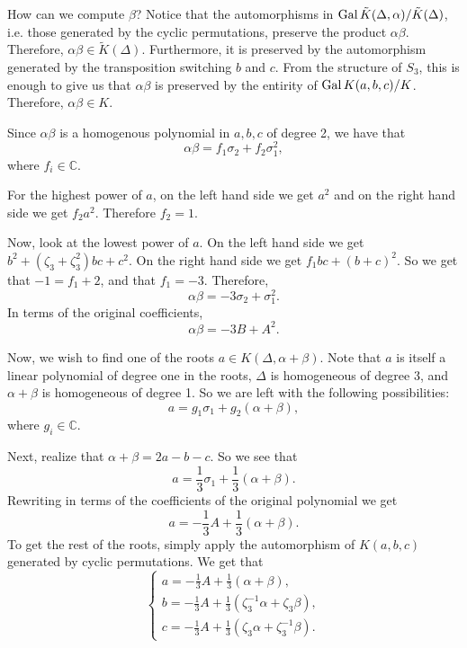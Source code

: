 How can we compute \(\beta\)? Notice that the
automorphisms in \(\operatorname{Gal} \tilde K(\Delta, \alpha) / \tilde K(\Delta)\), i.e. those generated by the
cyclic permutations, preserve the product \(\alpha\beta\). Therefore, \(\alpha\beta \in \tilde K(\Delta)\). 
Furthermore, it is preserved by the automorphism generated by the transposition switching \(b\) and \(c\).
From the structure of \(S_3\), this is enough to give us that \(\alpha\beta\) is preserved by the entirity
of \(\operatorname{Gal} K(a,b,c) / K\). Therefore, \(\alpha\beta \in K\).

Since \(\alpha\beta\) is a homogenous polynomial in \(a, b, c\) of degree 2, we have that
\begin{equation}
\alpha\beta = f_1 \sigma_2 + f_2 \sigma_1^2, 
\end{equation}
where \(f_i \in \mathbb C\).

For the highest power of \(a\), on the left hand side we get \(a^2\) and on the right hand side we
get \(f_2 a^2\). Therefore \(f_2 = 1\).

Now, look at the lowest power of \(a\). On the left hand side we get \(b^2 + (\zeta_3 + \zeta_3^2)bc + c^2\).
On the right hand side we get \(f_1 bc + (b + c)^2\). So we get that \(-1 = f_1 + 2\), and that \(f_1 = -3\).
Therefore,
\begin{equation}
\alpha\beta = -3 \sigma_2 + \sigma_1^2.
\end{equation}
In terms of the original coefficients,
\begin{equation}
\alpha\beta = -3B + A^2.
\end{equation}

Now, we wish to find one of the roots \(a \in K(\Delta, \alpha + \beta)\). Note that \(a\) is itself
a linear polynomial of degree one in the roots, \(\Delta\) is homogeneous of degree 3, and
\(\alpha + \beta\) is homogeneous of degree 1. So we are left with the following possibilities:
\begin{equation}
a = g_1 \sigma_1 +g_2 (\alpha + \beta),
\end{equation}
where \(g_i \in \mathbb C\).

Next, realize that \(\alpha + \beta = 2a - b - c\). So we see that
\begin{equation}
a = \frac{1}{3} \sigma_1 + \frac{1}{3} (\alpha + \beta).
\end{equation}
Rewriting in terms of the coefficients of the original polynomial we get
\begin{equation}
a = -\frac{1}{3} A + \frac{1}{3}(\alpha + \beta).
\end{equation}
To get the rest of the roots, simply apply the automorphism of \(K(a, b, c)\) generated by cyclic permutations.
We get that
\begin{equation}
\begin{cases}
a = -\frac{1}{3} A + \frac{1}{3}(\alpha + \beta), \\
b = -\frac{1}{3} A + \frac{1}{3}(\zeta_3^{-1} \alpha + \zeta_3 \beta), \\
c = -\frac{1}{3} A + \frac{1}{3}(\zeta_3 \alpha + \zeta_3^{-1} \beta). 
\end{cases}
\end{equation}

